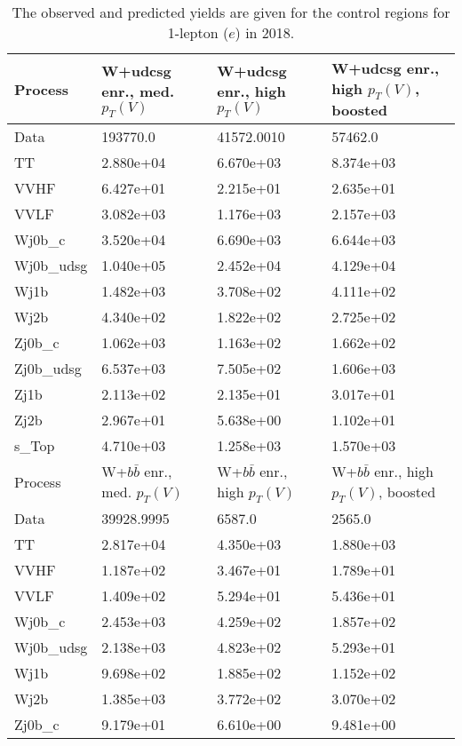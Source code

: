 \begin{table}
\centering
\caption[2018 1-lepton ($e$) control region yields]{
                  The observed and predicted yields are given for the
                  control regions for 1-lepton ($e$) in 2018.
                  }
{\footnotesize
\begin{tabularx}{0.8\textwidth}{|X|X|X|X|}
\hline
Process & W+udcsg enr., med. $p_{T}(V)$ & W+udcsg enr., high $p_{T}(V)$ & W+udcsg enr., high $p_{T}(V)$, boosted \\
\hline
Data & 193770.0 & 41572.0010 & 57462.0 \\
\hline
TT & 2.880e+04 & 6.670e+03 & 8.374e+03 \\
VVHF & 6.427e+01 & 2.215e+01 & 2.635e+01 \\
VVLF & 3.082e+03 & 1.176e+03 & 2.157e+03 \\
Wj0b\_c & 3.520e+04 & 6.690e+03 & 6.644e+03 \\
Wj0b\_udsg & 1.040e+05 & 2.452e+04 & 4.129e+04 \\
Wj1b & 1.482e+03 & 3.708e+02 & 4.111e+02 \\
Wj2b & 4.340e+02 & 1.822e+02 & 2.725e+02 \\
Zj0b\_c & 1.062e+03 & 1.163e+02 & 1.662e+02 \\
Zj0b\_udsg & 6.537e+03 & 7.505e+02 & 1.606e+03 \\
Zj1b & 2.113e+02 & 2.135e+01 & 3.017e+01 \\
Zj2b & 2.967e+01 & 5.638e+00 & 1.102e+01 \\
s\_Top & 4.710e+03 & 1.258e+03 & 1.570e+03 \\
\hline
\hline
Process & W+$b\bar{b}$ enr., med. $p_{T}(V)$ & W+$b\bar{b}$ enr., high $p_{T}(V)$ & W+$b\bar{b}$ enr., high $p_{T}(V)$, boosted \\
\hline
Data & 39928.9995 & 6587.0 & 2565.0 \\
\hline
TT & 2.817e+04 & 4.350e+03 & 1.880e+03 \\
VVHF & 1.187e+02 & 3.467e+01 & 1.789e+01 \\
VVLF & 1.409e+02 & 5.294e+01 & 5.436e+01 \\
Wj0b\_c & 2.453e+03 & 4.259e+02 & 1.857e+02 \\
Wj0b\_udsg & 2.138e+03 & 4.823e+02 & 5.293e+01 \\
Wj1b & 9.698e+02 & 1.885e+02 & 1.152e+02 \\
Wj2b & 1.385e+03 & 3.772e+02 & 3.070e+02 \\
Zj0b\_c & 9.179e+01 & 6.610e+00 & 9.481e+00 \\

\end{tabularx}}
\end{table}
